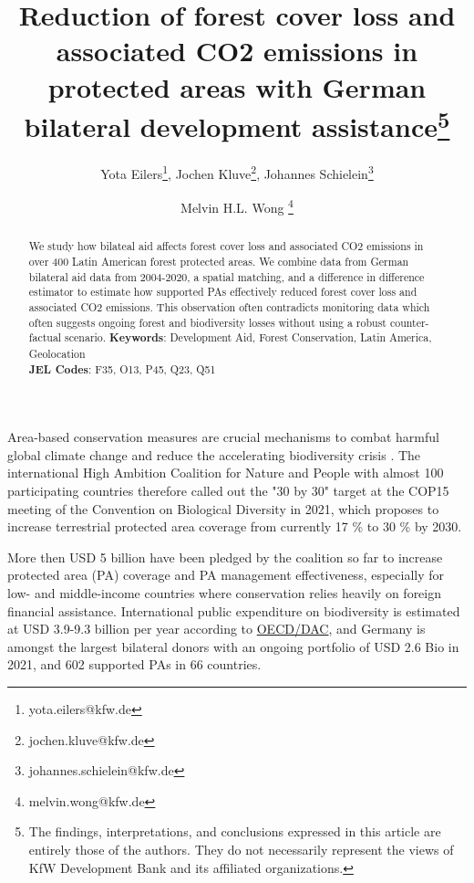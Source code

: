 \documentclass{article}
\title{Reduction of forest cover loss and associated CO2 emissions in protected areas with German bilateral development assistance\thanks{The findings, interpretations, and conclusions expressed in this article are entirely those of the authors. They do not necessarily represent the views of KfW Development Bank and its affiliated organizations.}}
\author{Yota Eilers\thanks{yota.eilers@kfw.de}, Jochen Kluve\thanks{jochen.kluve@kfw.de}, Johannes Schielein\thanks{johannes.schielein@kfw.de} \and Melvin H.L. Wong \thanks{melvin.wong@kfw.de}}
\begin{document}

\maketitle
\begin{abstract}
We study how bilateal aid affects forest cover loss and associated CO2 emissions in over 400 Latin American forest protected areas. We combine data from German bilateral aid data from 2004-2020, a spatial matching, and a difference in difference estimator to estimate how supported PAs effectively reduced forest cover loss and associated CO2 emissions. This observation often contradicts monitoring data which often suggests ongoing forest and biodiversity losses without using a robust counter-factual scenario.
		\vspace{0.5cm}
		\noindent\textbf{Keywords}: Development Aid, Forest Conservation, Latin America, Geolocation%
		\\
		\textbf{JEL Codes}: F35, O13, P45, Q23, Q51
		
		\vspace{0.5cm}
	\end{abstract}
	
	
	


Area-based conservation measures are crucial mechanisms to combat harmful global climate change and reduce the accelerating biodiversity crisis \citep{shukla2019climate, diaz2019global}. The international  High Ambition Coalition for Nature and People with almost 100 participating countries therefore called out the "30 by 30" target at the COP15 meeting of the Convention on Biological Diversity in 2021, which proposes to increase terrestrial protected area coverage from currently 17 \% to 30 \% by 2030.

More then USD 5 billion have been pledged by the coalition so far to increase protected area (PA) coverage and PA management effectiveness, especially for low- and middle-income countries where conservation relies heavily on foreign financial assistance. International public expenditure on biodiversity is estimated at USD 3.9-9.3 billion per year according to \href{https://www.oecd.org/environment/resources/biodiversity/report-a-comprehensive-overview-of-global-biodiversity-finance.pdf}{OECD/DAC}, and Germany is amongst the largest bilateral donors with an ongoing portfolio of USD 2.6 Bio in 2021, and 602 supported PAs in 66 countries.
\end{document}
